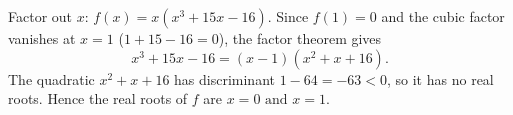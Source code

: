 Factor out \(x\): \(f(x)=x(x^3+15x-16)\). Since \(f(1)=0\) and the cubic factor vanishes at \(x=1\) (\(1+15-16=0\)), the factor theorem gives
\[
x^3+15x-16=(x-1)(x^2+x+16).
\]
The quadratic \(x^2+x+16\) has discriminant \(1-64=-63<0\), so it has no real roots. Hence the real roots of \(f\) are \(\boxed{x=0\text{ and }x=1}\).

